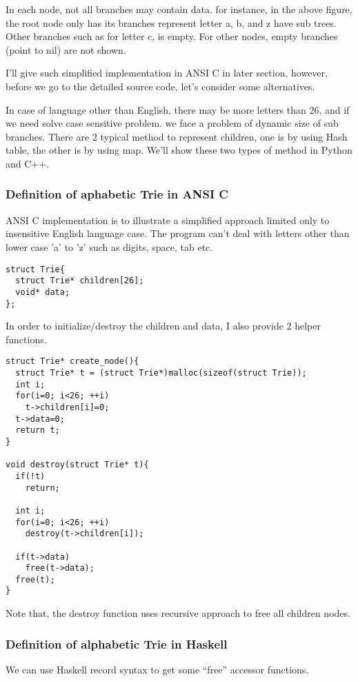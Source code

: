 \documentclass{article}
\begin{document}
In each node, not all branches may contain data. for instance, in the
above figure, the root node only has its branches represent letter a,
b, and z have sub trees. Other branches such as for letter c, is
empty. For other nodes, empty branches (point to nil) are not shown.

I'll give such simplified implementation in ANSI C in later section,
however, before we go to the detailed source code, let's consider some
alternatives. 

In case of language other than English, there may be more letters than 26, 
and if we need
solve case sensitive problem. we face a problem of dynamic size of sub
branches. There are 2 typical method to represent children, one is by
using Hash table, the other is by using map. We'll show these two types
of method in Python and C++.

\subsubsection*{Definition of aphabetic Trie in ANSI C}
ANSI C implementation is to illustrate a simplified approach limited only
to insensitive English language case. The program can't deal with letters 
other than lower case 'a' to 'z' such as digits, space, tab etc.

\lstset{language=C}
\begin{lstlisting}
struct Trie{
  struct Trie* children[26];
  void* data;
};
\end{lstlisting}

In order to initialize/destroy the children and data, I also provide 2 helper
functions.

\begin{lstlisting}
struct Trie* create_node(){
  struct Trie* t = (struct Trie*)malloc(sizeof(struct Trie));
  int i;
  for(i=0; i<26; ++i)
    t->children[i]=0;
  t->data=0;
  return t;
}

void destroy(struct Trie* t){
  if(!t)
    return;

  int i;
  for(i=0; i<26; ++i)
    destroy(t->children[i]);

  if(t->data)
    free(t->data);
  free(t);
}
\end{lstlisting}

Note that, the destroy function uses recursive approach to free all
children nodes.

\subsubsection*{Definition of alphabetic Trie in Haskell}
We can use Haskell record syntax to get some ``free'' accessor
functions\cite{wiki-trie}. 
\end{document}
